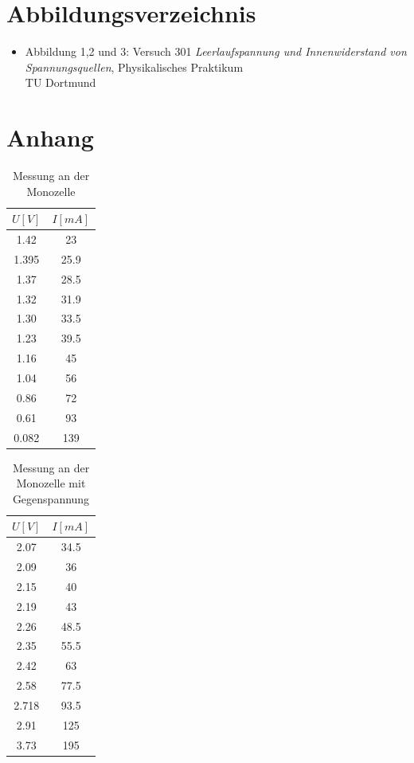 \documentclass[11pt]{article}
\begin{document}
\section{Abbildungsverzeichnis}
\begin{itemize}
\item Abbildung 1,2 und 3: Versuch 301 \textit{Leerlaufspannung und Innenwiderstand von Spannungsquellen}, Physikalisches Praktikum\\ TU Dortmund
\end{itemize}
\section{Anhang}
\begin{table}[h]
 \centering
 \caption{Messung an der Monozelle}
 \begin{tabular}{|c|c|}
  \hline
  $U[V]$ & $I[mA]$  \\
  \hline
  1.42 & 23 \\
  1.395 & 25.9 \\
  1.37& 28.5 \\
  1.32 & 31.9 \\
  1.30 & 33.5\\
  1.23 & 39.5\\
  1.16 & 45 \\
  1.04 & 56\\
  0.86 & 72\\
  0.61 & 93\\
  0.082 & 139\\
  \hline
 \end{tabular}
 \label{Messung 1}
 \end{table}
 
 
 \begin{table}[h]
 \centering
 \caption{Messung an der Monozelle mit Gegenspannung}
 \begin{tabular}{|c|c|}
  \hline
  $U[V]$ & $I[mA]$  \\
  \hline
  2.07 & 34.5 \\
  2.09 & 36 \\
  2.15 & 40 \\
  2.19 & 43 \\
  2.26 & 48.5\\
  2.35 & 55.5\\
  2.42 & 63 \\
  2.58 & 77.5\\
  2.718 & 93.5\\
  2.91 & 125\\
  3.73 & 195\\
  \hline
 \end{tabular}
 \label{Messung 2}
 \end{table}
 
\end{document}
